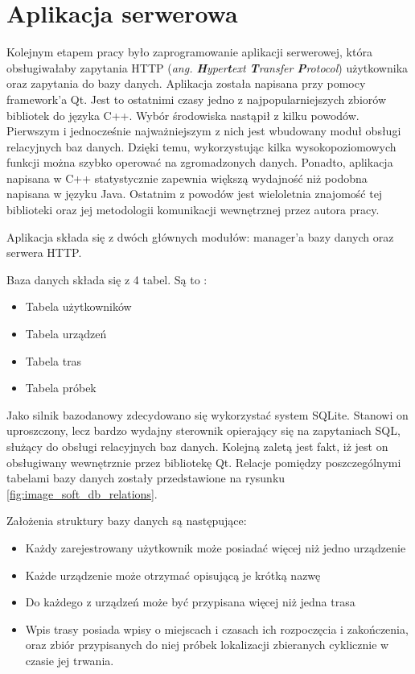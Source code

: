 \section{Aplikacja serwerowa}

Kolejnym etapem pracy było zaprogramowanie aplikacji serwerowej, która obsługiwałaby zapytania HTTP (\textit{ang. \textbf{H}yper\textbf{t}ext \textbf{T}ransfer \textbf{P}rotocol}) użytkownika oraz zapytania do bazy danych. Aplikacja została napisana przy pomocy framework'a Qt. Jest to ostatnimi czasy jedno z najpopularniejszych zbiorów bibliotek do języka C++. Wybór środowiska nastąpił z kilku powodów. Pierwszym i jednocześnie najważniejszym z nich jest wbudowany moduł obsługi relacyjnych baz danych. Dzięki temu, wykorzystując kilka wysokopoziomowych funkcji można szybko operować na zgromadzonych danych. Ponadto, aplikacja napisana w C++ statystycznie zapewnia większą wydajność niż podobna napisana w języku Java. Ostatnim z powodów jest wieloletnia znajomość tej biblioteki oraz jej metodologii komunikacji wewnętrznej przez autora pracy.

Aplikacja składa się z dwóch głównych modułów: manager'a bazy danych oraz serwera HTTP.

Baza danych składa się z 4 tabel. Są to :

\begin{itemize}
\item Tabela użytkowników
\item Tabela urządzeń
\item Tabela tras
\item Tabela próbek
\end{itemize}

Jako silnik bazodanowy zdecydowano się wykorzystać system SQLite. Stanowi on uproszczony, lecz bardzo wydajny sterownik opierający się na zapytaniach SQL, służący do obsługi relacyjnych baz danych. Kolejną zaletą jest fakt, iż jest on obsługiwany wewnętrznie przez bibliotekę Qt.
Relacje pomiędzy poszczególnymi tabelami bazy danych zostały przedstawione na rysunku \ref{fig:image_soft_db_relations}.

Założenia struktury bazy danych są następujące:

\begin{itemize}
\item Każdy zarejestrowany użytkownik może posiadać więcej niż jedno urządzenie
\item Każde urządzenie może otrzymać opisującą je krótką nazwę
\item Do każdego z urządzeń może być przypisana więcej niż jedna trasa
\item Wpis trasy posiada wpisy o miejscach i czasach ich rozpoczęcia i zakończenia, oraz zbiór przypisanych do niej próbek lokalizacji zbieranych cyklicznie w czasie jej trwania.
\end{itemize}

